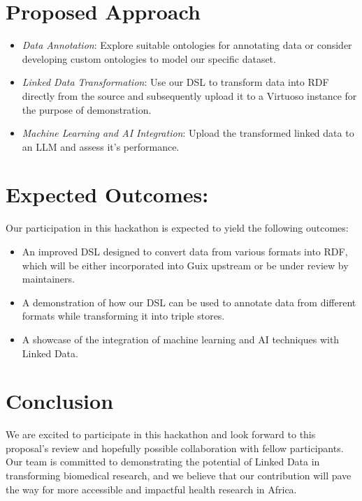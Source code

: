 \documentclass[notitlepage,11pt]{article}
\begin{document}
\section*{Proposed Approach}
\label{sec:orgc9007af}

\begin{itemize}
\item \emph{Data Annotation}: Explore suitable ontologies for annotating data or consider developing custom ontologies to model our specific dataset.
\item \emph{Linked Data Transformation}: Use our DSL to transform data into RDF directly from the source and subsequently upload it to a Virtuoso instance for the purpose of demonstration.
\item \emph{Machine Learning and AI Integration}: Upload the transformed linked data to an LLM and assess it's performance.
\end{itemize}

\section*{Expected Outcomes:}
\label{sec:org87e67e7}
Our participation in this hackathon is expected to yield the following outcomes:

\begin{itemize}
\item An improved DSL designed to convert data from various formats into RDF, which will be either incorporated into Guix upstream or be under review by maintainers.
\item A demonstration of how our DSL can be used to annotate data from different formats while transforming it into triple stores.
\item A showcase of the integration of machine learning and AI techniques with Linked Data.
\end{itemize}

\section*{Conclusion}
\label{sec:orge9fc71f}

We are excited to participate in this hackathon and look forward to this proposal's review and hopefully possible collaboration with fellow participants.  Our team is committed to demonstrating the potential of Linked Data in transforming biomedical research, and we believe that our contribution will pave the way for more accessible and impactful health research in Africa.
\end{document}
